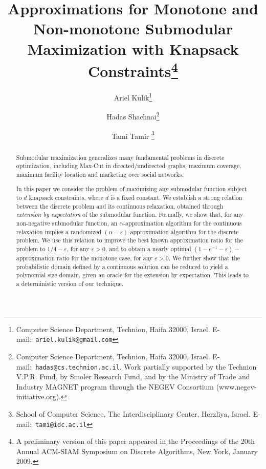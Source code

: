 \documentclass[11pt]{article}
\newcommand{\eps}{\varepsilon}
\begin{document}
\title{\Large
Approximations for Monotone and Non-monotone Submodular Maximization
with
Knapsack Constraints\footnote{A preliminary version of this paper appeared in the Proceedings of the 20th Annual ACM-SIAM Symposium on Discrete
Algorithms, New York, January 2009.}}
\author{
Ariel Kulik\thanks{Computer Science Department, Technion, Haifa 32000,
Israel. \mbox{E-mail: {\tt ariel.kulik@gmail.com}}} \and Hadas
Shachnai\thanks{Computer Science Department, Technion, Haifa 32000,
Israel. \mbox{E-mail: {\tt hadas@cs.technion.ac.il}}. Work partially supported
by the Technion V.P.R. Fund, by Smoler Research Fund, and by the Ministry of Trade and Industry MAGNET
program through the NEGEV
Consortium (www.negev-initiative.org). }
\and Tami Tamir
\thanks{ School of Computer Science, The
Interdisciplinary Center, Herzliya, Israel.
\mbox{E-mail: {\tt tami@idc.ac.il}}}
}
\date{}

\maketitle


\begin{abstract}

Submodular maximization generalizes many fundamental problems in
discrete optimization, including Max-Cut in directed/undirected
graphs, maximum coverage, maximum facility location and marketing
over social networks.

In this paper we consider the problem of maximizing any submodular
function subject to $d$ knapsack constraints, where $d$ is a fixed
constant. We establish a strong relation between the discrete
problem and its continuous relaxation, obtained through {\em
extension by expectation} of the submodular function. Formally, we
show that, for any non-negative submodular function, an
$\alpha$-approximation algorithm for the continuous relaxation
implies a randomized $(\alpha - \eps)$-approximation algorithm for
the discrete problem. We use this relation to improve the best
known approximation ratio for the problem to $1/4- \eps$, for any
$\eps > 0$, and to obtain a nearly optimal
$(1-e^{-1}-\eps)-$approximation ratio for the monotone case, for
any $\eps>0$.
We further show that the probabilistic domain defined by a
continuous solution can be reduced to yield a polynomial size
domain, given an oracle for the extension by expectation. This
leads to a deterministic version of our technique.
\end{abstract}
\bigskip
\end{document}
